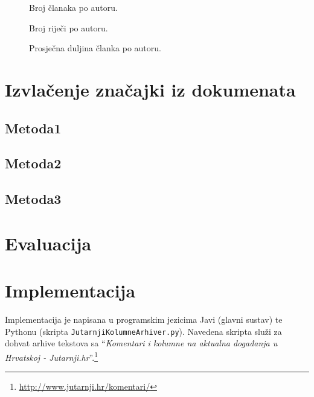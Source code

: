 \documentclass{article}
\begin{document}
\begin{figure}[!h]
\begin{center}

\end{center}
\caption{Broj članaka po autoru.}
\label{fig:articlesPerAuthor}
\end{figure}

\begin{figure}[!h]
\begin{center}

\end{center}
\caption{Broj riječi po autoru.}
\label{fig:wordsPerAuthor}
\end{figure}

\begin{figure}[!h]
\begin{center}

\end{center}
\caption{Prosječna duljina članka po autoru.}
\label{fig:avgWordsPerAuthorArticle}
\end{figure}


\section{Izvlačenje značajki iz dokumenata}

\subsection{Metoda1}
\subsection{Metoda2}
\subsection{Metoda3}

\section{Evaluacija}

\section{Implementacija}
\label{sec:implementacija}
Implementacija je napisana u programskim jezicima Javi (glavni sustav) te
Pythonu (skripta \texttt{JutarnjiKolumneArhiver.py}). Navedena skripta služi za
dohvat arhive tekstova sa ``\emph{Komentari i kolumne na aktualna događanja u Hrvatskoj -
Jutarnji.hr}''.\footnote{\url{http://www.jutarnji.hr/komentari/}}
\end{document}
